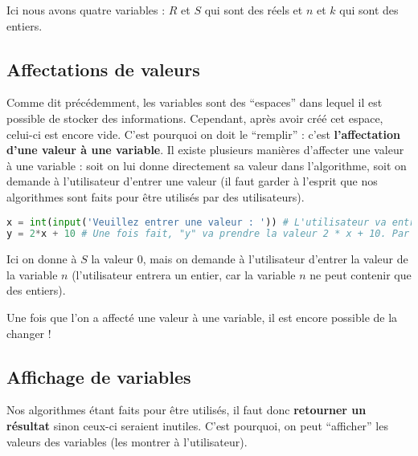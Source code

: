 	\begin{tip}
		Ici nous avons quatre variables : $R$ et $S$ qui sont des réels et $n$ et $k$ qui sont des entiers.
	\end{tip}
	
	\subsection{Affectations de valeurs}
	
	Comme dit précédemment, les variables sont des ``espaces'' dans lequel il est possible de stocker des informations.
	\newpar
	Cependant, après avoir créé cet espace, celui-ci est encore vide. C'est pourquoi on doit le ``remplir'' : c'est \textbf{l'affectation d'une valeur à une variable}.
	\newpar
	Il existe plusieurs manières d'affecter une valeur à une variable : soit on lui donne directement sa valeur dans l'algorithme, soit on demande à l'utilisateur d'entrer une valeur (il faut garder à l'esprit que nos algorithmes sont faits pour être utilisés par des utilisateurs).
	
	\begin{formula}[En python]
		\entretitreetliste
\begin{lstlisting}[language=python]
x = int(input('Veuillez entrer une valeur : ')) # L'utilisateur va entrer une valeur, on la convertir en entier et on va affecter celui-ci à notre variable "x".
y = 2*x + 10 # Une fois fait, "y" va prendre la valeur 2 * x + 10. Par exemple, si l'utilisateur entre "10", "y" vaudra 30.
\end{lstlisting}
	\end{formula}
	
	\begin{tip}
		Ici on donne à $S$ la valeur $0$, mais on demande à l'utilisateur d'entrer la valeur de la variable $n$ (l'utilisateur entrera un entier, car la variable $n$ ne peut contenir que des entiers).
	\end{tip}
	
	Une fois que l'on a affecté une valeur à une variable, il est encore possible de la changer !
	
	\subsection{Affichage de variables}
	
	Nos algorithmes étant faits pour être utilisés, il faut donc \textbf{retourner un résultat} sinon ceux-ci seraient inutiles.
	\newline
	C'est pourquoi, on peut ``afficher'' les valeurs des variables (les montrer à l'utilisateur).
	
